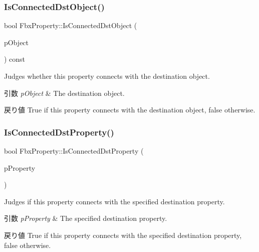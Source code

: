 \subsubsection{\texorpdfstring{Is\+Connected\+Dst\+Object()}{IsConnectedDstObject()}}
{\footnotesize\ttfamily bool Fbx\+Property\+::\+Is\+Connected\+Dst\+Object (\begin{DoxyParamCaption}\item[{const \hyperlink{class_fbx_object}{Fbx\+Object} $\ast$}]{p\+Object }\end{DoxyParamCaption}) const}

Judges whether this property connects with the destination object. 
\begin{DoxyParams}{引数}
{\em p\+Object} & The destination object. \\
\hline
\end{DoxyParams}
\begin{DoxyReturn}{戻り値}
{\ttfamily True} if this property connects with the destination object, {\ttfamily false} otherwise. 
\end{DoxyReturn}
\mbox{\label{class_fbx_property_aff04371bd84802d5c50c397e5716b604}} 
\subsubsection{\texorpdfstring{Is\+Connected\+Dst\+Property()}{IsConnectedDstProperty()}}
{\footnotesize\ttfamily bool Fbx\+Property\+::\+Is\+Connected\+Dst\+Property (\begin{DoxyParamCaption}\item[{const \hyperlink{class_fbx_property}{Fbx\+Property} \&}]{p\+Property }\end{DoxyParamCaption})}

Judges if this property connects with the specified destination property. 
\begin{DoxyParams}{引数}
{\em p\+Property} & The specified destination property. \\
\hline
\end{DoxyParams}
\begin{DoxyReturn}{戻り値}
{\ttfamily True} if this property connects with the specified destination property, {\ttfamily false} otherwise. 
\end{DoxyReturn}
\mbox{\label{class_fbx_property_af4fc85f2c880d813903e158147aeeae4}} 
